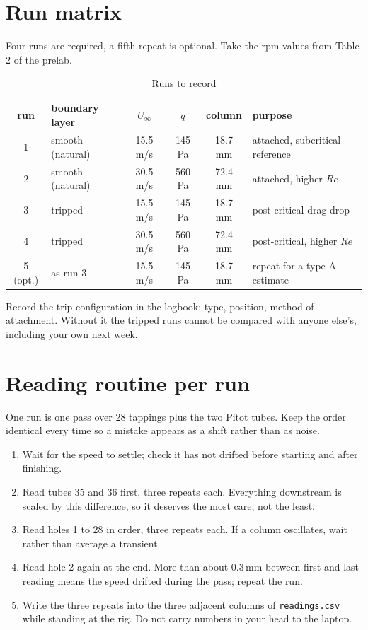 \documentclass[11pt,a4paper]{article}
\newcommand{\ReD}{\ensuremath{\mathit{Re}}}
\begin{document}
\section{Run matrix}

Four runs are required, a fifth repeat is optional. Take the rpm values from Table 2 of the prelab.

\begin{table}[H]
\centering
\caption{Runs to record}
\small
\begin{tabular}{@{}c p{3.6cm} c c c p{5.0cm}@{}}
\toprule
run & boundary layer & $U_\infty$ & $q$ & column & purpose \\
\midrule
1 & smooth (natural) & 15.5 m/s & 145 Pa & 18.7 mm & attached, subcritical reference \\
2 & smooth (natural) & 30.5 m/s & 560 Pa & 72.4 mm & attached, higher \ReD \\
3 & tripped & 15.5 m/s & 145 Pa & 18.7 mm & post-critical drag drop \\
4 & tripped & 30.5 m/s & 560 Pa & 72.4 mm & post-critical, higher \ReD \\
5 (opt.) & as run 3 & 15.5 m/s & 145 Pa & 18.7 mm & repeat for a type A estimate \\
\bottomrule
\end{tabular}
\end{table}

Record the trip configuration in the logbook: type, position, method of attachment. Without it the
tripped runs cannot be compared with anyone else's, including your own next week.

\section{Reading routine per run}

One run is one pass over 28 tappings plus the two Pitot tubes. Keep the order identical every time
so a mistake appears as a shift rather than as noise.

\begin{enumerate}[leftmargin=1.5em,itemsep=3pt]
\item Wait for the speed to settle; check it has not drifted before starting and after finishing.
\item Read tubes 35 and 36 first, three repeats each. Everything downstream is scaled by this
difference, so it deserves the most care, not the least.
\item Read holes 1 to 28 in order, three repeats each. If a column oscillates, wait rather than
average a transient.
\item Read hole 2 again at the end. More than about 0.3\,mm between first and last reading means the
speed drifted during the pass; repeat the run.
\item Write the three repeats into the three adjacent columns of \texttt{readings.csv} while standing
at the rig. Do not carry numbers in your head to the laptop.
\end{enumerate}
\end{document}
